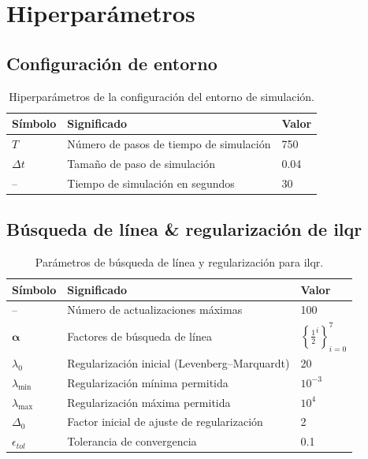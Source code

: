 \chapter{Hiperparámetros}
\label{appendix:hiperparametros}
\section{Configuración de entorno}
\begin{table}[h]
\centering
\caption{Hiperparámetros de la configuración del entorno de simulación.}
\begin{tabular}{|l|l|l|}
\hline
\textbf{Símbolo} & \textbf{Significado} & \textbf{Valor} \\ \hline
$T$ & Número de pasos de tiempo de simulación & 750  \\ \hline
$\Delta t$ & Tamaño de paso de simulación & 0.04 \\ \hline
– & Tiempo de simulación en segundos & 30  \\ \hline
\end{tabular}
\end{table}

\section{Búsqueda de línea \& regularización de \acrshort{ilqr}}
\begin{table}[H]
\centering
\caption{Parámetros de búsqueda de línea y regularización para \acrshort{ilqr}.}
\begin{tabular}{|l|l|l|}
\hline
\textbf{Símbolo} & \textbf{Significado} & \textbf{Valor} \\ \hline
– & Número de actualizaciones máximas & 100 \\ \hline
$\bm{\alpha}$ & Factores de búsqueda de línea & $\left\{\frac{1}{2}^{i}\right\}_{i=0}^{7}$ \\ \hline
$\lambda_0$ & Regularización inicial (Levenberg–Marquardt) & 20 \\ \hline
$\lambda_{\min}$ & Regularización mínima permitida & $10^{-3}$ \\ \hline
$\lambda_{\max}$ & Regularización máxima permitida & $10^{4}$ \\ \hline
$\Delta_{0}$ & Factor inicial de ajuste de regularización & 2 \\ \hline
$\epsilon_{tol}$ & Tolerancia de convergencia & 0.1 \\ \hline
\end{tabular}
\end{table}

